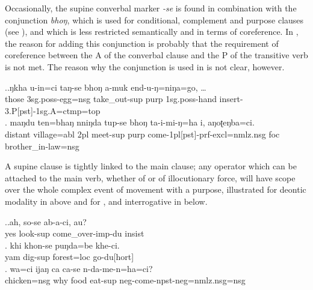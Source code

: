 Occasionally, the supine converbal marker \emph{-se} is found in combination with the conjunction \emph{bhoŋ}, which is used for conditional, complement and purpose clauses (see ), and which is less restricted semantically and in terms of coreference. In \Next[a], the reason for adding this conjunction is probably that the requirement of coreference between the A of the converbal clause and the P of the transitive  verb is not met. The reason why the conjunction is used in \Next[b] is not clear, however.  

\ex.\ag.ŋkha u-in=ci    taŋ-se    bhoŋ a-muk           end-u-ŋ=niŋa=go, {\dots}\\
those {\sc 3sg.poss-}egg{\sc =nsg} take\_out{\sc -sup} {\sc purp} {\sc 1sg.poss-}hand   insert{\sc -3.P[pst]-1sg.A=ctmp=top}\\ 
\bg. maŋdu ten=bhaŋ nniŋda tup-se bhoŋ ta-i-mi-ŋ=ha i, aŋoʈeŋba=ci.\\
distant village{\sc =abl} {\sc 2pl} meet{\sc -sup} {\sc purp} come{\sc -1pl[pst]-prf-excl=nmlz.nsg} {\sc foc} brother\_in-law{\sc =nsg}\\
 


A supine clause is tightly linked to the main clause; any operator which can be attached to the main verb, whether of  or of illocutionary force, will have scope over the whole complex event of movement with a purpose, illustrated for deontic modality in \LLast[b] above and for ,  and interrogative  in \Next below.  

\ex.\ag.ah,    so-se           ab-a-ci,      au?\\
yes look{\sc -sup} come\_over{\sc -imp-du} {\sc insist}\\
 
\bg. khi khon-se         puŋda=be    khe-ci.\\
yam dig{\sc -sup} forest{\sc =loc} go{\sc -du[hort]}\\
 
\bg.  wa=ci         ijaŋ ca  ca-se    n-da-me-n=ha=ci?\\
chicken{\sc  =nsg} why food eat{\sc -sup} {\sc neg-}come{\sc -npst-neg=nmlz.nsg=nsg}\\
 


